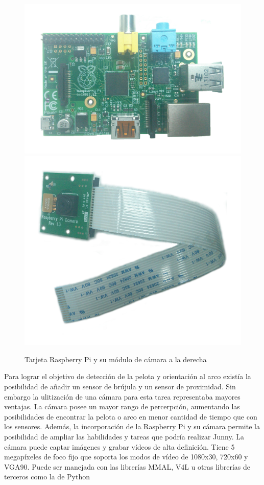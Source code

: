 \begin{figure}[hbtp]
\centering
\includegraphics[scale=0.06]{imagenes/RaspberryPi.jpg}
\includegraphics[scale=0.06]{imagenes/CamRasp.jpg}
\caption{Tarjeta Raspberry Pi y su módulo de cámara a la derecha}
\label{fig:RaspYcamara}
\end{figure}

Para lograr el objetivo de detecci\'on de la pelota y orientaci\'on al arco existía la posibilidad de añadir un sensor de br\'ujula y un sensor de proximidad. Sin embargo la ulitizaci\'on de una c\'amara para esta tarea representaba mayores ventajas. La cámara posee un mayor rango de percerpción, aumentando las posibilidades de encontrar la pelota o arco en menor cantidad de tiempo que con los sensores. Adem\'as, la incorporación de la Raspberry Pi  \cite{raspberry} y su cámara permite la posibilidad de ampliar las habilidades y tareas que podr\'ia realizar Junny. La c\'amara puede captar im\'agenes y grabar vídeos de alta definición. Tiene 5 megapíxeles de foco fijo que soporta los modos de vídeo de 1080x30, 720x60 y \gls{VGA}90. Puede ser manejada con las librerías \gls{MMAL}, \gls{V4L} u otras librerías de terceros como la de Python \cite{raspberrycam}

